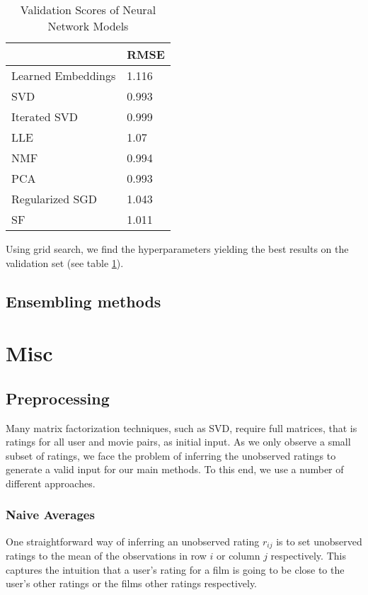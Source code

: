 \documentclass[10pt,conference,compsocconf]{IEEEtran}
\begin{document}
\begin{table}[ht]
\centering
\caption{Validation Scores of Neural Network Models}
\label{table:neural_net_models}
\begin{tabular}{|l|l|}
\hline
                & RMSE  \\ \hline
Learned Embeddings     & 1.116 \\ \hline
SVD             & 0.993 \\ \hline
Iterated SVD    & 0.999 \\ \hline
LLE             & 1.07  \\ \hline
NMF             & 0.994 \\ \hline
PCA             & 0.993 \\ \hline
Regularized SGD & 1.043 \\ \hline
SF              & 1.011 \\ \hline
\end{tabular}
\end{table}

Using grid search,  we find the hyperparameters yielding the best results on the validation set (see table \ref{table:neural_net_models}). 


\subsection{Ensembling methods}


\section{Misc}

\subsection{Preprocessing}

Many matrix factorization techniques, such as SVD, require full matrices, that is ratings for all user and movie pairs, as initial input. As we only observe a small subset of ratings, we face the problem of inferring the unobserved ratings to generate a valid input for our main methods. To this end, we use a number of different approaches.

\subsubsection{Naive Averages}
One straightforward way of inferring an unobserved rating $r_{ij}$ is to set unobserved ratings to the mean of the observations in row $i$ or column $j$ respectively. This captures the intuition that a user's rating for a film is going to be close to the user's other ratings or the films other ratings respectively.
\end{document}
